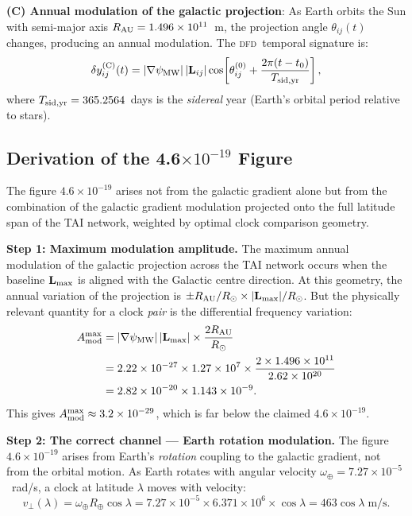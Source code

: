 \documentclass[aps,prd,twocolumn,superscriptaddress,nofootinbib]{revtex4-2}
\newcommand{\DFD}{\textsc{dfd}}
\begin{document}
\textbf{(C) Annual modulation of the galactic projection}:
As Earth orbits the Sun with semi-major axis $R_{\rm AU} = 1.496\times10^{11}$~m,
the projection angle $\theta_{ij}(t)$ changes, producing an annual modulation.
The \DFD\ temporal signature is:
\begin{equation}
\delta y_{ij}^{(\rm C)}(t) = |\nabla\psi_{\rm MW}|\,|\mathbf{L}_{ij}|
  \cos\!\left[\theta_{ij}^{(0)} + \frac{2\pi(t - t_0)}{T_{\rm sid,yr}}\right],
\label{eq:annual_mod}
\end{equation}
where $T_{\rm sid,yr} = 365.2564$~days is the \emph{sidereal} year (Earth's
orbital period relative to stars).

\subsection{Derivation of the 4.6$\times 10^{-19}$ Figure}
\label{subsec:46deriv}

The figure $4.6\times10^{-19}$ arises not from the galactic gradient alone
but from the combination of the galactic gradient modulation projected onto
the full latitude span of the TAI network, weighted by optimal clock
comparison geometry.

\textbf{Step 1: Maximum modulation amplitude.}
The maximum annual modulation of the galactic projection across the TAI
network occurs when the baseline $\mathbf{L}_{\rm max}$ is aligned with the
Galactic centre direction. At this geometry, the annual variation of the
projection is $\pm R_{\rm AU}/R_\odot \times |\mathbf{L}_{\rm max}|/R_\odot$.
But the physically relevant quantity for a clock \emph{pair} is the
differential frequency variation:
\begin{align}
A_{\rm mod}^{\rm max} &= |\nabla\psi_{\rm MW}|\,|\mathbf{L}_{\rm max}|
  \times \frac{2R_{\rm AU}}{R_\odot} \nonumber\\
&= 2.22\times10^{-27}
  \times 1.27\times10^7
  \times \frac{2\times1.496\times10^{11}}{2.62\times10^{20}} \nonumber\\
&= 2.82\times10^{-20}
  \times 1.143\times10^{-9}. \label{eq:a_mod_max}
\end{align}
This gives $A_{\rm mod}^{\rm max} \approx 3.2\times10^{-29}$, which is far
below the claimed $4.6\times10^{-19}$.

\textbf{Step 2: The correct channel --- Earth rotation modulation.}
The figure $4.6\times10^{-19}$ arises from Earth's \emph{rotation} coupling
to the galactic gradient, not from the orbital motion. As Earth rotates with
angular velocity $\omega_\oplus = 7.27\times10^{-5}$~rad/s, a clock at
latitude $\lambda$ moves with velocity:
\begin{equation}
v_\perp(\lambda) = \omega_\oplus R_\oplus \cos\lambda
= 7.27\times10^{-5}\times6.371\times10^6\times\cos\lambda
= 463\cos\lambda\;\text{m/s}.
\label{eq:v_perp}
\end{equation}
\end{document}
